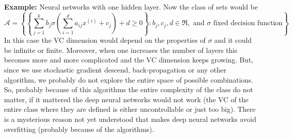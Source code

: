 \documentclass[11pt, english]{article}
\newcommand{\su}[2]{\sum\limits_{#1}^{#2}}
\begin{document}
\textbf{Example:} Neural networks with one hidden layer. 
Now the class of sets would be 
\begin{equation}
	\mathcal{A}=\left\{\left\{\su{j=1}{k} b_j \sigma\left(\su{i=1}{d}a_{ij}x^{(i)}+c_j\right)+d\geq 0\right\}:b_j,c_j,d\in\Re,\text{ and }\sigma \text{ fixed decision function}\right\}.
\end{equation}
In this case the VC dimension would depend on the properties of $\sigma$ and it could be infinite or finite. Moreover, when one increases the number of layers this becomes more and more complicated and the VC dimension keeps growing. But, since we use stochastic gradient descend, back-propagation or any other algorithm, we probably do not explore the entire space of possible combinations. So, probably because of this algorithms the entire complexity of the class do not matter, if it mattered the deep neural networks would not work (the VC of the entire class where they are defined is either uncontrollable or just too big). There is a mysterious reason not yet understood that makes deep neural networks avoid overfitting (probably because of the algorithms).\\
\end{document}

